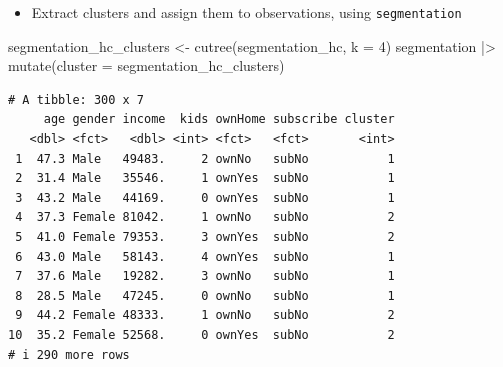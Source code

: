 \documentclass[
  ignorenonframetext,
]{beamer}
\newenvironment{Shaded}{\begin{snugshade}}{\end{snugshade}}
\newcommand{\AttributeTok}[1]{\textcolor[rgb]{0.40,0.45,0.13}{#1}}
\newcommand{\DecValTok}[1]{\textcolor[rgb]{0.68,0.00,0.00}{#1}}
\newcommand{\FunctionTok}[1]{\textcolor[rgb]{0.28,0.35,0.67}{#1}}
\newcommand{\NormalTok}[1]{\textcolor[rgb]{0.00,0.23,0.31}{#1}}
\newcommand{\OtherTok}[1]{\textcolor[rgb]{0.00,0.23,0.31}{#1}}
\newcommand{\SpecialCharTok}[1]{\textcolor[rgb]{0.37,0.37,0.37}{#1}}
\providecommand{\tightlist}{%
  \setlength{\itemsep}{0pt}\setlength{\parskip}{0pt}}\usepackage{longtable,booktabs,array}
\begin{document}
\begin{frame}[fragile]{}
\label{section-33}
\begin{itemize}
\tightlist
\item
  Extract clusters and assign them to observations, using
  \texttt{segmentation}
\end{itemize}

\tiny

\begin{Shaded}
\begin{Highlighting}[]
\NormalTok{segmentation\_hc\_clusters }\OtherTok{\textless{}{-}} \FunctionTok{cutree}\NormalTok{(segmentation\_hc, }\AttributeTok{k =} \DecValTok{4}\NormalTok{)}
\NormalTok{segmentation }\SpecialCharTok{|\textgreater{}} 
  \FunctionTok{mutate}\NormalTok{(}\AttributeTok{cluster =}\NormalTok{ segmentation\_hc\_clusters)}
\end{Highlighting}
\end{Shaded}

\begin{verbatim}
# A tibble: 300 x 7
     age gender income  kids ownHome subscribe cluster
   <dbl> <fct>   <dbl> <int> <fct>   <fct>       <int>
 1  47.3 Male   49483.     2 ownNo   subNo           1
 2  31.4 Male   35546.     1 ownYes  subNo           1
 3  43.2 Male   44169.     0 ownYes  subNo           1
 4  37.3 Female 81042.     1 ownNo   subNo           2
 5  41.0 Female 79353.     3 ownYes  subNo           2
 6  43.0 Male   58143.     4 ownYes  subNo           1
 7  37.6 Male   19282.     3 ownNo   subNo           1
 8  28.5 Male   47245.     0 ownNo   subNo           1
 9  44.2 Female 48333.     1 ownNo   subNo           2
10  35.2 Female 52568.     0 ownYes  subNo           2
# i 290 more rows
\end{verbatim}
\end{frame}
\end{document}
